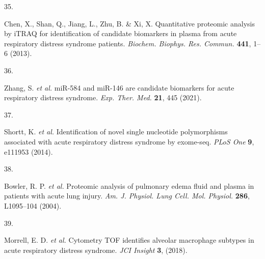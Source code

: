 \documentclass[
  11,
  a4paper,
]{article}
\newlength{\cslhangindent}
\newlength{\csllabelwidth}
\newenvironment{CSLReferences}[2] %
 {\begin{list}{}{%
  \setlength{\itemindent}{0pt}
  \setlength{\leftmargin}{0pt}
  \setlength{\parsep}{0pt}
  \ifodd #1
   \setlength{\leftmargin}{\cslhangindent}
   \setlength{\itemindent}{-1\cslhangindent}
  \fi
  \setlength{\itemsep}{#2\baselineskip}}}
 {\end{list}}
\newcommand{\CSLLeftMargin}[1]{\parbox[t]{\csllabelwidth}{\strut#1\strut}}
\newcommand{\CSLRightInline}[1]{\parbox[t]{\linewidth - \csllabelwidth}{\strut#1\strut}}
\begin{document}
\begin{CSLReferences}{0}{0}
\CSLLeftMargin{35. }%
\CSLRightInline{Chen, X., Shan, Q., Jiang, L., Zhu, B. \& Xi, X.
Quantitative proteomic analysis by {iTRAQ} for identification of
candidate biomarkers in plasma from acute respiratory distress syndrome
patients. \emph{Biochem. Biophys. Res. Commun.} \textbf{441}, 1--6
(2013).}

\CSLLeftMargin{36. }%
\CSLRightInline{Zhang, S. \emph{et al.} miR-584 and miR-146 are
candidate biomarkers for acute respiratory distress syndrome. \emph{Exp.
Ther. Med.} \textbf{21}, 445 (2021).}

\CSLLeftMargin{37. }%
\CSLRightInline{Shortt, K. \emph{et al.} Identification of novel single
nucleotide polymorphisms associated with acute respiratory distress
syndrome by exome-seq. \emph{PLoS One} \textbf{9}, e111953 (2014).}

\CSLLeftMargin{38. }%
\CSLRightInline{Bowler, R. P. \emph{et al.} Proteomic analysis of
pulmonary edema fluid and plasma in patients with acute lung injury.
\emph{Am. J. Physiol. Lung Cell. Mol. Physiol.} \textbf{286}, L1095--104
(2004).}

\CSLLeftMargin{39. }%
\CSLRightInline{Morrell, E. D. \emph{et al.} Cytometry {TOF} identifies
alveolar macrophage subtypes in acute respiratory distress syndrome.
\emph{JCI Insight} \textbf{3}, (2018).}

\end{CSLReferences}
\end{document}

